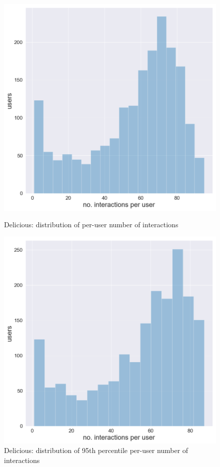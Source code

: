 \begin{figure}[htbp]
    \begin{minipage}{0.48\textwidth}
    \centering
      \includegraphics[width=\textwidth]{datasets/Delicious_user_interaction_distr.png}
      \caption{Delicious: distribution of per-user number of interactions}
      \label{fig:delisious_dist}
    \end{minipage}
    \hfill
    \begin{minipage}{0.48\textwidth}
    \centering
     \includegraphics[width=\textwidth]{datasets/Delicious_95th_interaction_distr.png} 
     \caption{Delicious: distribution of 95th percentile per-user number of interactions}
      \label{fig:delisious_dist_95}
    \end{minipage}
\end{figure}

